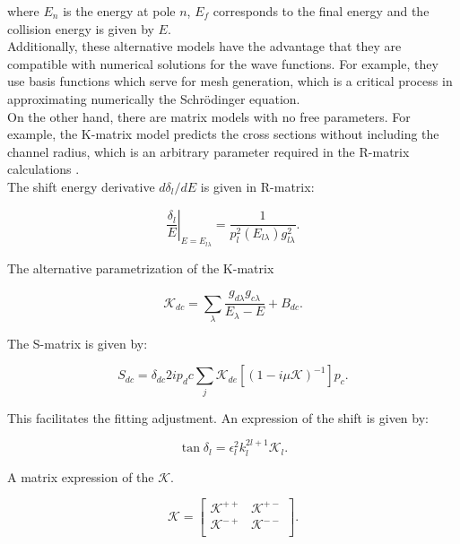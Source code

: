 \documentclass[openany]{book}
\begin{document}
where $E_n$ is the energy at pole $n$, $E_f$ corresponds to the final energy and the collision energy is given by $E$. \\

Additionally, these alternative models have the advantage that they are compatible with numerical solutions for the wave functions. For example, they use basis functions which serve for mesh generation, which is a critical process in approximating numerically the Schrödinger equation. \\

On the other hand, there are matrix models with no free parameters. For example, the K-matrix model predicts the cross sections without including the channel radius, which is an arbitrary parameter required in the R-matrix calculations \cite{humblet_1990}. \\

The shift energy derivative $d\delta_l/dE$ is given in R-matrix:

\begin{equation}\label{eq:rmatrix_kmatrix_deltaE}
	 \left. \frac{\delta_l}{E} \right|_{E = E_{l\lambda}} = \frac{1}{p^2_l(E_{l\lambda})g^2_{l\lambda}}.
\end{equation}

The alternative parametrization of the K-matrix 

\begin{equation}\label{eq:rmatrix_kmatrix_alternative}
	\mathcal{K}_{dc} = \sum_{\lambda} \frac{g_{d\lambda}g_{c\lambda} }{E_\lambda - E} + B_{dc}.
\end{equation}

The S-matrix is given by:

\begin{equation}\label{eq:rmatrix_kmatrix_smatrix}
	S_{dc} = \delta_{dc}  2ip_dc \sum_{j} \mathcal{K}_{de} [(1- i\mu \mathcal{K})^{-1}]p_c. 
\end{equation}

This facilitates the fitting adjustment. An expression of the shift is given by:

\begin{equation}\label{eq:rmatrix_kmatrix_deltal}
	\tan {\delta_l} = \epsilon^2_l k^{2l+1}_l \mathcal{K}_l.
\end{equation}

A matrix expression of the $\mathcal{K}$. 


\begin{equation}\label{eq:rmatrix_kmatrix_K_matrixElements}
	\mathcal{K} = \left[\begin{matrix}
		\mathcal{K}^{++} & \mathcal{K}^{+-} \\
		\mathcal{K}^{-+} & \mathcal{K}^{--} \\
	\end{matrix}\right].
\end{equation}
\end{document}
